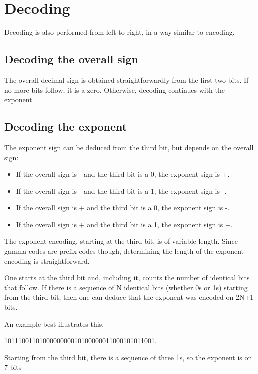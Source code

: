 \documentclass[final,leqno,onefignum,onetabnum]{siamltex1213}
\begin{document}
\section{Decoding}
\label{section-decoding}

Decoding is also performed from left to right, in a way similar to encoding.

\vspace{20pt}
\subsection{Decoding the overall sign}

The overall decimal sign is obtained straightforwardly from the first two bits. If no more bits follow, it is a zero. Otherwise, decoding continues with the exponent.

\subsection{Decoding the exponent}

The exponent sign can be deduced from the third bit, but depends on the overall sign:

\begin{itemize}
\item If the overall sign is - and the third bit is a 0, the exponent sign is +.
\item If the overall sign is - and the third bit is a 1, the exponent sign is -.
\item If the overall sign is + and the third bit is a 0, the exponent sign is -.
\item If the overall sign is + and the third bit is a 1, the exponent sign is +.
\end{itemize}

The exponent encoding, starting at the third bit, is of variable length. Since gamma codes are prefix codes though, determining the length of the exponent encoding is straightforward.

One starts at the third bit and, including it, counts the number of identical bits that follow. If there is a sequence of N identical bits (whether 0s or 1s) starting from the third bit, then one can deduce that the exponent was encoded on 2N+1 bits.

An example best illustrates this.

1011100110100000000010100000011000101011001.

Starting from the third bit, there is a sequence of three 1s, so the exponent is on 7 bits
\end{document}
